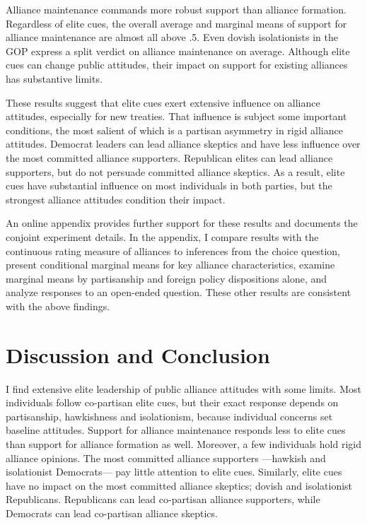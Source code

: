\documentclass[12pt]{article}
\begin{document}
Alliance maintenance commands more robust support than alliance formation. 
Regardless of elite cues, the overall average and marginal means of support for alliance maintenance are almost all above .5. 
Even dovish isolationists in the GOP express a split verdict on alliance maintenance on average.
Although elite cues can change public attitudes, their impact on support for existing alliances has substantive limits.


These results suggest that elite cues exert extensive influence on alliance attitudes, especially for new treaties.
That influence is subject some important conditions, the most salient of which is a partisan asymmetry in rigid alliance attitudes. 
Democrat leaders can lead alliance skeptics and have less influence over the most committed alliance supporters. 
Republican elites can lead alliance supporters, but do not persuade committed alliance skeptics. 
As a result, elite cues have substantial influence on most individuals in both parties, but the strongest alliance attitudes condition their impact. 


An online appendix provides further support for these results and documents the conjoint experiment details. 
In the appendix, I compare results with the continuous rating measure of alliances to inferences from the choice question, present conditional marginal means for key alliance characteristics, examine marginal means by partisanship and foreign policy dispositions alone, and analyze responses to an open-ended question. 
These other results are consistent with the above findings. 


\section{Discussion and Conclusion} 


I find extensive elite leadership of public alliance attitudes with some limits.  
Most individuals follow co-partisan elite cues, but their exact response depends on partisanship, hawkishness and isolationism, because individual concerns set baseline attitudes.
Support for alliance maintenance responds less to elite cues than support for alliance formation as well. 
Moreover, a few individuals hold rigid alliance opinions.  
The most committed alliance supporters ---hawkish and isolationist Democrats--- pay little attention to elite cues.
Similarly, elite cues have no impact on the most committed alliance skeptics; dovish and isolationist Republicans. 
Republicans can lead co-partisan alliance supporters, while Democrats can lead co-partisan alliance skeptics. 
\end{document}
